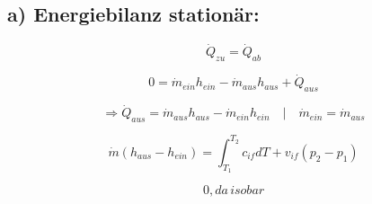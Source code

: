 \subsection*{a) Energiebilanz stationär:}

\[
\dot{Q}_{zu} = \dot{Q}_{ab}
\]

\[
0 = \dot{m}_{ein} h_{ein} - \dot{m}_{aus} h_{aus} + \dot{Q}_{aus}
\]

\[
\Rightarrow \dot{Q}_{aus} = \dot{m}_{aus} h_{aus} - \dot{m}_{ein} h_{ein} \quad | \quad \dot{m}_{ein} = \dot{m}_{aus}
\]

\[
\dot{m} (h_{aus} - h_{ein}) = \int_{T_1}^{T_2} c_{if} dT + v_{if} (p_2 - p_1)
\]

\[
0, da \, isobar
\]